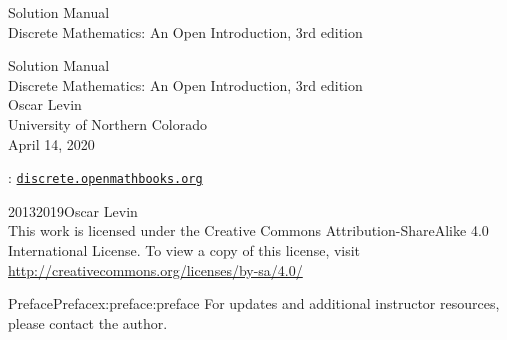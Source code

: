 \documentclass[twoside,11pt,]{book}
\newcommand{\titlepagefont}{\relax}
\newcommand{\mono}[1]{\texttt{#1}}
\numberwithin{equation}{chapter}
\begin{document}
\frontmatter
\thispagestyle{empty}
{\titlepagefont\centering
\vspace*{0.28\textheight}
{\Huge Solution Manual}\\[2\baselineskip]
{\LARGE Discrete Mathematics: An Open Introduction, 3rd edition}\\
}
\clearpage
\thispagestyle{empty}
\null%
\clearpage
\thispagestyle{empty}
{\titlepagefont\centering
\vspace*{0.14\textheight}
{\Huge Solution Manual}\\[\baselineskip]
{\LARGE Discrete Mathematics: An Open Introduction, 3rd edition}\\[3\baselineskip]
{\Large Oscar Levin}\\[0.5\baselineskip]
{\Large University of Northern Colorado}\\[3\baselineskip]
{\Large April 14, 2020}\\}
\clearpage
\thispagestyle{empty}
\hypertarget{g:colophon:idp140957718256}{}
: \href{http:\slash{}\slash{}discrete.openmathbooks.org}{\mono{discrete.openmathbooks.org}}\par\medskip
\noindent\textcopyright{}2013\textendash{}2019\quad{}Oscar Levin\\[0.5\baselineskip]
 This work is licensed under the Creative Commons Attribution-ShareAlike 4.0 International License. To view a copy of this license, visit \href{http://creativecommons.org/licenses/by-sa/4.0/}{http:\slash{}\slash{}creativecommons.org\slash{}licenses\slash{}by-sa\slash{}4.0\slash{}}\par\medskip
{}
\null\clearpage
%
%
\typeout{************************************************}
\typeout{************************************************}
%
\begin{preface}{Preface}{}{Preface}{}{}{x:preface:preface}
For updates and additional instructor resources, please contact the author.%
\end{preface}
\setcounter{tocdepth}{2}
\renewcommand*\contentsname{Contents}
\tableofcontents
\mainmatter
\end{document}
